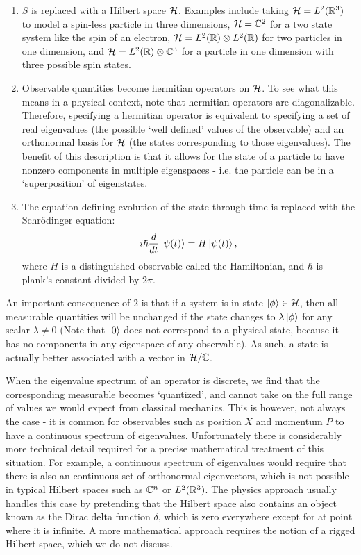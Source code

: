 \documentclass[a4paper]{article}
\begin{document}
\begin{enumerate}
    \item $S$ is replaced with a Hilbert space $\mathcal{H}$. Examples include taking $\mathcal{H} = L^2(\mathbb{R}^3)$ to model a spin-less particle in three dimensions, $\mathcal{H} = \mathbb{C}^2$ for a two state system like the spin of an electron, $\mathcal{H} = L^2(\mathbb{R}) \otimes L^2(\mathbb{R})$ for two particles in one dimension, and $\mathcal{H} = L^2(\mathbb{R}) \otimes \mathbb{C}^3$ for a particle in one dimension with three possible spin states.
    \item Observable quantities become hermitian operators on $\mathcal{H}$. To see what this means in a physical context, note that hermitian operators are diagonalizable. Therefore, specifying a hermitian operator is equivalent to specifying a set of real eigenvalues (the possible `well defined' values of the observable) and an orthonormal basis for $\mathcal{H}$ (the states corresponding to those eigenvalues). The benefit of this  description is that it allows for the state of a particle to have nonzero components in multiple eigenspaces - i.e. the particle can be in a `superposition' of eigenstates. 
    \item The equation defining evolution of the state through time is replaced with the Schr\"{o}dinger equation: 
    $$i\hbar\frac{d}{dt}\left\lvert \psi(t) \right\rangle = H\left\lvert \psi(t) \right\rangle,$$
    where $H$ is a distinguished observable called the Hamiltonian, and $\hbar$ is plank's constant divided by $2 \pi$.
\end{enumerate}

An important consequence of $2$ is that if a system is in state $\left\lvert \phi \right\rangle \in \mathcal{H}$, then all measurable quantities will be unchanged if the state changes to $\lambda\left\lvert \phi \right\rangle$ for any scalar $\lambda \neq 0$ (Note that $\left\lvert 0 \right\rangle$ does not correspond to a physical state, because it has no components in any eigenspace of any observable). As such, a state is actually better associated with a vector in $\mathcal{H} / \mathbb{C}$.

When the eigenvalue spectrum of an operator is discrete, we find that the corresponding measurable becomes `quantized', and cannot take on the full range of values we would expect from classical mechanics. This is however, not always the case - it is common for observables such as position $X$ and momentum $P$ to have a continuous spectrum of eigenvalues. Unfortunately there is considerably more technical detail required for a precise mathematical treatment of this situation. For example, a continuous spectrum of eigenvalues would require that there is also an continuous set of orthonormal eigenvectors, which is not possible in typical Hilbert spaces such as $\mathbb{C}^n$ or $L^2(\mathbb{R}^3)$. The physics approach usually handles this case by pretending that the Hilbert space also contains an object known as the Dirac delta function $\delta$, which is zero everywhere except for at point where it is infinite. A more mathematical approach requires the notion of a rigged Hilbert space, which we do not discuss.
\end{document}

